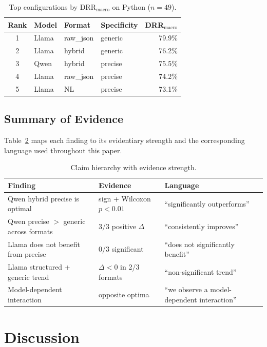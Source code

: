 \begin{table}[t]
\centering
\small
\caption{Top configurations by DRR$_\text{macro}$ on Python ($n = 49$).}
\label{tab:best}
\begin{tabular}{clllr}
\toprule
Rank & Model & Format & Specificity & DRR$_\text{macro}$ \\
\midrule
1 & Llama & raw\_json & generic & 79.9\% \\
2 & Llama & hybrid & generic & 76.2\% \\
3 & Qwen & hybrid & precise & 75.5\% \\
4 & Llama & raw\_json & precise & 74.2\% \\
5 & Llama & NL & precise & 73.1\% \\
\bottomrule
\end{tabular}
\end{table}

\subsection{Summary of Evidence}
\label{sec:results-summary}

Table~\ref{tab:claims} maps each finding to its evidentiary strength and the corresponding language used throughout this paper.

\begin{table}[t]
\centering
\small
\caption{Claim hierarchy with evidence strength.}
\label{tab:claims}
\begin{tabular}{p{5.5cm}ll}
\toprule
Finding & Evidence & Language \\
\midrule
Qwen hybrid precise is optimal & sign + Wilcoxon $p < 0.01$ & ``significantly outperforms'' \\
Qwen precise $>$ generic across formats & 3/3 positive $\Delta$ & ``consistently improves'' \\
Llama does not benefit from precise & 0/3 significant & ``does not significantly benefit'' \\
Llama structured + generic trend & $\Delta < 0$ in 2/3 formats & ``non-significant trend'' \\
Model-dependent interaction & opposite optima & ``we observe a model-dependent interaction'' \\
\bottomrule
\end{tabular}
\end{table}


\section{Discussion}
\label{sec:discussion}

